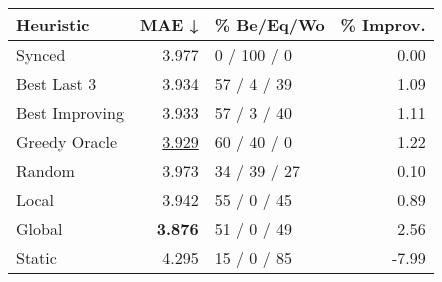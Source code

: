 \begin{tabular}{lrlr}
\toprule
\textbf{Heuristic} & \textbf{MAE ↓} & \textbf{\% Be/Eq/Wo} & \textbf{\% Improv.} \\
\midrule
            Synced &          3.977 &          0 / 100 / 0 &                0.00 \\
\midrule
       Best Last 3 &          3.934 &          57 / 4 / 39 &                1.09 \\
    Best Improving &          3.933 &          57 / 3 / 40 &                1.11 \\
\addlinespace
     Greedy Oracle &          \underline{3.929} &          60 / 40 / 0 &                1.22 \\
            Random &          3.973 &         34 / 39 / 27 &                0.10 \\
\midrule
             Local &          3.942 &          55 / 0 / 45 &                0.89 \\
            Global &          \textbf{3.876} &          51 / 0 / 49 &                2.56 \\
\midrule
            Static &          4.295 &          15 / 0 / 85 &               -7.99 \\
\bottomrule
\end{tabular}

\label{tab:ds_iid_lr01_le1_bs4_Summary}
